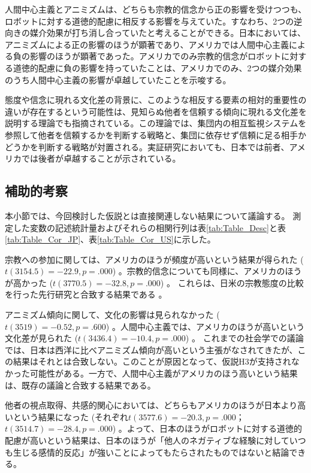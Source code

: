 \documentclass[a4j,12pt]{jreport}
\begin{document}
人間中心主義とアニミズムは、どちらも宗教的信念から正の影響を受けつつも、ロボットに対する道徳的配慮に相反する影響を与えていた。すなわち、2つの逆向きの媒介効果が打ち消し合っていたと考えることができる。日本においては、アニミズムによる正の影響のほうが顕著であり、アメリカでは人間中心主義による負の影響のほうが顕著であった。アメリカでのみ宗教的信念がロボットに対する道徳的配慮に負の影響を持っていたことは、アメリカでのみ、2つの媒介効果のうち人間中心主義の影響が卓越していたことを示唆する。


態度や信念に現れる文化差の背景に、このような相反する要素の相対的重要性の違いが存在するという可能性は、見知らぬ他者を信頼する傾向に現れる文化差を説明する理論\cite{yamagishi}でも指摘されている。この理論では、集団内の相互監視システムを参照して他者を信頼するかを判断する戦略と、集団に依存せず信頼に足る相手かどうかを判断する戦略が対置される。実証研究においても、日本では前者、アメリカでは後者が卓越することが示されている。

\subsection{補助的考察}
本小節では、今回検討した仮説とは直接関連しない結果について議論する。
測定した変数の記述統計量およびそれらの相関行列は表\ref{tab:Table_Desc}と表\ref{tab:Table_Cor_JP}、表\ref{tab:Table_Cor_US}に示した。



宗教への参加に関しては、アメリカのほうが頻度が高いという結果が得られた ($t(3154.5) = -22.9, p = .000$) 。宗教的信念についても同様に、アメリカのほうが高かった ($t(3770.5) = -32.8, p = .000$) 。
これらは、日米の宗教態度の比較を行った先行研究と合致する結果である\cite{kava} 。



アニミズム傾向に関して、文化の影響は見られなかった ($t(3519) = -0.52, p = .600$) 。人間中心主義では、アメリカのほうが高いという文化差が見られた ($t(3436.4) = -10.4, p = .000$) 。
これまでの社会学での議論では、日本は西洋に比べアニミズム傾向が高いという主張がなされてきた\cite{hosaka}が、この結果はそれとは合致しない。このことが原因となって、仮説H3が支持されなかった可能性がある。一方で、人間中心主義がアメリカのほう高いという結果は、既存の議論\cite{abe}と合致する結果である。


他者の視点取得、共感的関心においては、どちらもアメリカのほうが日本より高いという結果になった (それぞれ$t(3577.6) = -20.3, p = .000$；$t(3514.7) = -28.4, p = .000$) 。よって、日本のほうがロボットに対する道徳的配慮が高いという結果は、日本のほうが「他人のネガティブな経験に対していつも生じる感情的反応」が強いことによってもたらされたものではないと結論できる。
\end{document}
